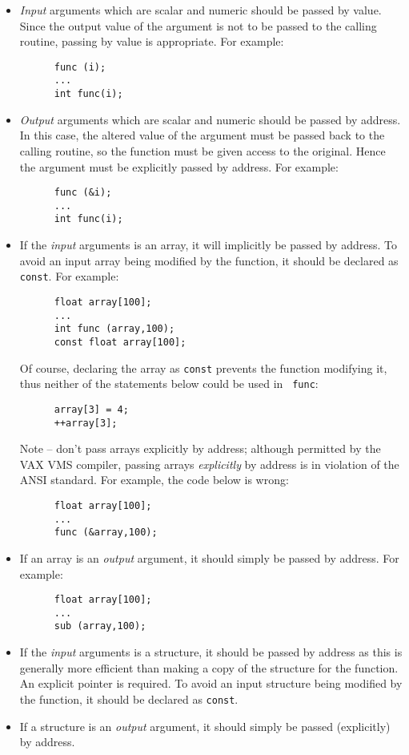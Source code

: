 \begin{itemize}
\item {\sl Input\/} arguments which are scalar and numeric should be 
passed by value.
Since the output value of the argument is not to be passed to the calling
routine, passing by value is appropriate. For example:
\begin{verbatim}
      func (i);
      ...
      int func(i);
\end{verbatim}

\item {\sl Output\/} arguments which are scalar and numeric should be 
passed by address.
In this case, the altered value of the argument must be passed 
back to the calling
routine, so the function must be given access to the original. 
Hence the argument must be explicitly passed by address.
For example:
\begin{verbatim}
      func (&i);
      ...
      int func(i);
\end{verbatim}


\item If the  {\sl input\/} arguments is an array,
it will implicitly be passed by address. To avoid an input array being 
modified by the function, it should be declared as {\tt const}.
For example:
\begin{verbatim}
      float array[100];
      ...
      int func (array,100);
      const float array[100];
\end{verbatim}
Of course, declaring the array as {\tt const} prevents the function
modifying it, thus neither of the statements below could be used in {\tt 
func}:
\begin{verbatim}
      array[3] = 4;
      ++array[3];
\end{verbatim}

Note -- don't pass arrays explicitly by address;
although permitted by the VAX VMS compiler, passing arrays {\sl explicitly\/} 
by address is in violation of the ANSI standard.
For example, the code below is wrong:
\begin{verbatim}
      float array[100];
      ...
      func (&array,100);
\end{verbatim}


\item If an array is an  {\sl output\/} argument, it should simply
be passed by address. For example:
\begin{verbatim}
      float array[100];
      ...
      sub (array,100);
\end{verbatim}


\item If the  {\sl input\/} arguments is a structure,
it should be passed by address as this is generally more efficient
than making a copy of the structure for the function.
An explicit pointer is required.
To avoid an input structure being 
modified by the function, it should be declared as {\tt const}.

\item If a structure  is an  {\sl output\/} argument, it should simply
be passed (explicitly) by address. 

\end{itemize}




